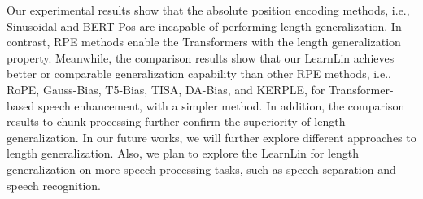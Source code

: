 \documentclass[journal]{IEEEtran}
\begin{document}
Our experimental results show that the absolute position encoding methods, i.e., Sinusoidal and BERT-Pos are incapable of performing length generalization. In contrast, RPE methods enable the Transformers with the length generalization property. Meanwhile, the comparison results show that our LearnLin achieves better or comparable generalization capability than other RPE methods, i.e., RoPE, Gauss-Bias, T5-Bias, TISA, DA-Bias, and KERPLE, for Transformer-based speech enhancement, with a simpler method. In addition, the comparison results to chunk processing further confirm the superiority of length generalization. In our future works, we will further explore different approaches to length generalization. Also, we plan to explore the LearnLin for length generalization on more speech processing tasks, such as speech separation and speech recognition. 





\end{document}
